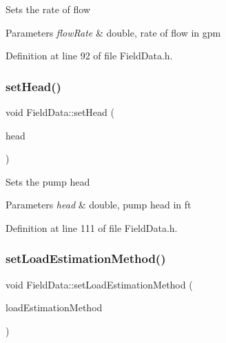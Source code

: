 Sets the rate of flow


\begin{DoxyParams}{Parameters}
{\em flow\+Rate} & double, rate of flow in gpm \\
\hline
\end{DoxyParams}


Definition at line 92 of file Field\+Data.\+h.

\mbox{\label{class_field_data_ac72a4f958930000bab0e2b772ee26711}} 
\subsubsection{\texorpdfstring{set\+Head()}{setHead()}}
{\footnotesize\ttfamily void Field\+Data\+::set\+Head (\begin{DoxyParamCaption}\item[{double}]{head }\end{DoxyParamCaption})\hspace{0.3cm}{\ttfamily [inline]}}

Sets the pump head


\begin{DoxyParams}{Parameters}
{\em head} & double, pump head in ft \\
\hline
\end{DoxyParams}


Definition at line 111 of file Field\+Data.\+h.

\mbox{\label{class_field_data_a7d1103b1832956d96146cbe26fb34a6d}} 
\subsubsection{\texorpdfstring{set\+Load\+Estimation\+Method()}{setLoadEstimationMethod()}}
{\footnotesize\ttfamily void Field\+Data\+::set\+Load\+Estimation\+Method (\begin{DoxyParamCaption}\item[{\hyperlink{class_field_data_a424e89914ba5684c01bb269dbe3312fd}{Load\+Estimation\+Method}}]{load\+Estimation\+Method }\end{DoxyParamCaption})\hspace{0.3cm}{\ttfamily [inline]}}

